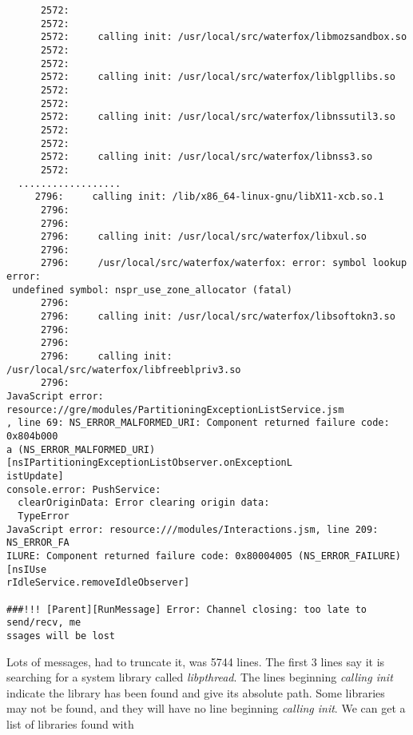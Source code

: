 \documentclass[a4paper]{article}  %
\begin{document}
\begin{tcolorbox}
\begin{verbatim}
      2572:
      2572:
      2572:     calling init: /usr/local/src/waterfox/libmozsandbox.so
      2572:
      2572:
      2572:     calling init: /usr/local/src/waterfox/liblgpllibs.so
      2572:
      2572:
      2572:     calling init: /usr/local/src/waterfox/libnssutil3.so
      2572:
      2572:
      2572:     calling init: /usr/local/src/waterfox/libnss3.so
      2572:
  ..................
     2796:     calling init: /lib/x86_64-linux-gnu/libX11-xcb.so.1
      2796:
      2796:
      2796:     calling init: /usr/local/src/waterfox/libxul.so
      2796:
      2796:     /usr/local/src/waterfox/waterfox: error: symbol lookup error:
 undefined symbol: nspr_use_zone_allocator (fatal)
      2796:
      2796:     calling init: /usr/local/src/waterfox/libsoftokn3.so
      2796:
      2796:
      2796:     calling init: /usr/local/src/waterfox/libfreeblpriv3.so
      2796:
JavaScript error: resource://gre/modules/PartitioningExceptionListService.jsm
, line 69: NS_ERROR_MALFORMED_URI: Component returned failure code: 0x804b000
a (NS_ERROR_MALFORMED_URI) [nsIPartitioningExceptionListObserver.onExceptionL
istUpdate]
console.error: PushService:
  clearOriginData: Error clearing origin data:
  TypeError
JavaScript error: resource:///modules/Interactions.jsm, line 209: NS_ERROR_FA
ILURE: Component returned failure code: 0x80004005 (NS_ERROR_FAILURE) [nsIUse
rIdleService.removeIdleObserver]

###!!! [Parent][RunMessage] Error: Channel closing: too late to send/recv, me
ssages will be lost
\end{verbatim}
\end{tcolorbox}
Lots of messages, had to truncate it, was 5744 lines.
The first 3 lines say it is searching for a system library called {\em libpthread}. The lines beginning {\em calling init} indicate the library has been found and give its absolute path. Some libraries may not be found, and they will have no line beginning {\em calling init}. We can get a list of libraries found with 
\end{document}
